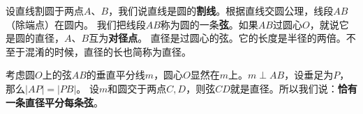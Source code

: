 \documentclass[12pt,UTF8]{ctexbook}
\begin{document}
设直线割圆于两点$A$、$B$，我们说直线是圆的\textbf{割线}。根据直线交圆公理，线段$AB$（除端点）在圆内。
我们把线段$AB$称为圆的一条\textbf{弦}。如果$AB$过圆心$O$，就说它是圆的直径，$A$、$B$互为\textbf{对径点}。
直径是过圆心的弦。它的长度是半径的两倍。不至于混淆的时候，直径的长也简称为直径。

考虑圆$O$上的弦$AB$的垂直平分线$m$，圆心$O$显然在$m$上。$m \perp AB$，设垂足为$P$，那么$|AP| = |PB|$。
设$m$和圆交于两点$C,D$，则弦$CD$就是直径。所以我们说：\textbf{恰有一条直径平分每条弦}。




\end{document}
